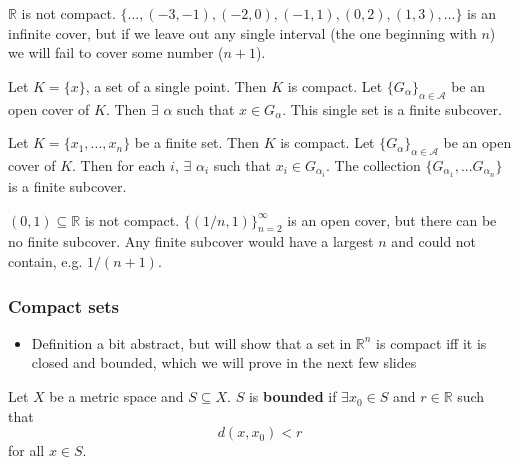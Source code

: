 \documentclass[compress]{beamer}
\def\R{\mathbb{R}}
\begin{document}
\begin{frame}
  \begin{example}
    $\R$ is not compact. $\{..., (-3, -1), (-2, 0),(-1,1), (0,2), (1,3),
    ... \}$ is an infinite cover, but if we leave out any single
    interval (the one beginning with $n$) we will fail to cover
    some number ($n+1$).
  \end{example}
\end{frame}

\begin{frame}
  \begin{example}
    Let $K = \{x\}$, a set of a single point. Then $K$ is compact. Let
    $\{G_\alpha\}_{\alpha \in \mathcal{A}}$ be an open cover of
    $K$. Then $\exists$ $\alpha$ such that $x \in G_\alpha$. This single
    set is a finite subcover.
  \end{example}
\end{frame}

\begin{frame}
  \begin{example}
    Let $K = \{x_1, ..., x_n\}$ be a finite set. Then $K$ is
    compact.  Let
    $\{G_\alpha\}_{\alpha \in \mathcal{A}}$ be an open cover of
    $K$. Then for each $i$, $\exists$ $\alpha_i$ such that $x_i \in
    G_{\alpha_i}$. 
    The collection $\{G_{\alpha_1}, ... G_{\alpha_n} \}$ is a finite
    subcover.
  \end{example}
\end{frame}

\begin{frame}
  \begin{example}
    $(0,1) \subseteq \R$ is not compact. $\{(1/n,1)\}_{n=2}^\infty$ is
    an open cover, but there can be no finite subcover. Any finite
    subcover would have a largest $n$ and could not contain,
    e.g. $1/(n+1)$. 
  \end{example}
\end{frame}


\begin{frame}
  \frametitle{Compact sets}
  \begin{itemize}
  \item Definition a bit abstract, but will show that a set in $\R^n$
    is compact iff it is closed and bounded, which we will prove in
    the next few slides 
  \end{itemize}
  \begin{definition}
    Let $X$ be a metric space and $S \subseteq X$. $S$ is
    \textbf{bounded} if $\exists x_0 \in S$ and $r \in \R$ such that 
    \[ d(x,x_0) < r \]
    for all $x \in S$.
  \end{definition}

\end{frame}
\end{document}
